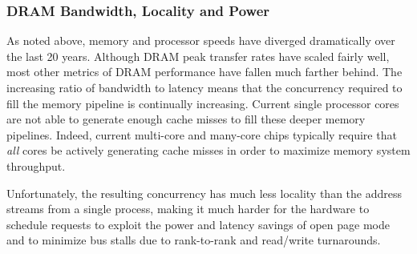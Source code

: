 \begin{comment}
Related work was rather widespread during the 1990's, but the technological 
environment has changed considerably, calling for a reconsideration of 
both what is important and what is feasible to implement.   More recent work
is generally focused on either incremental modifications to existing cache 
coherence protocols, or limited hardware modifications, such as hardware
barrier support for OpenMP~\cite{Voltron2007,OnChipMulticoreBarriers_2006}.
The recent SARC project~\cite{katevenis2010explicit} takes a somewhat 
broader view of the hardware issues, but does not tie this back to a formal 
model for specifying communication in parallel programs.  The ``HSA (Heterogeneous
System Architecture) Foundation''~\cite{HSA} proposes a work queue based
infrastructure for heterogeneous computing that is intended to allow hardware
implementation, but the focus is clearly on programming a single system composed
of a small number of fast, general-purpose cores and a larger number of ``throughput''
cores sharing a single memory space, while the current project considers 
communication for much larger systems.
\end{comment}



     
\subsubsection{DRAM Bandwidth, Locality and Power}
\label{sec:issue-dram}

As noted above, memory and processor speeds have diverged dramatically
over the last 20 years.  Although DRAM peak transfer rates have scaled fairly well,
most other metrics of DRAM performance have fallen much farther behind.
The increasing ratio of bandwidth to latency means that the concurrency required
to fill the memory pipeline is continually increasing.  Current single processor cores are not 
able to generate enough cache misses to fill these deeper memory pipelines.  Indeed, 
current multi-core and many-core chips typically require that \textit{all} cores be
actively generating cache misses in order to maximize memory system
throughput.  

Unfortunately, the resulting concurrency has much less locality than the address
streams from a single process, making it much harder for the hardware to schedule
requests to exploit the power and latency savings of open page mode and to 
minimize bus stalls due to rank-to-rank and read/write turnarounds.

